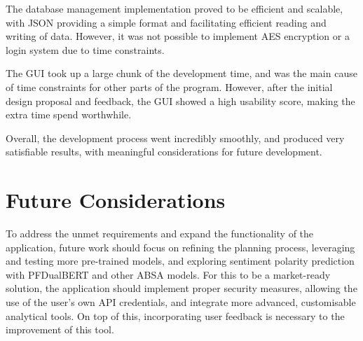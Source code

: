 The database management implementation proved to be efficient and scalable, with JSON providing a simple format and facilitating efficient reading and writing of data. However, it was not possible to implement AES encryption or a login system due to time constraints.

The GUI took up a large chunk of the development time, and was the main cause of time constraints for other parts of the program. However, after the initial design proposal and feedback, the GUI showed a high usability score, making the extra time spend worthwhile.

Overall, the development process went incredibly smoothly, and produced very satisfiable results, with meaningful considerations for future development.

\section{Future Considerations}
To address the unmet requirements and expand the functionality of the application, future work should focus on refining the planning process, leveraging and testing more pre-trained models, and exploring sentiment polarity prediction with PFDualBERT and other ABSA models. For this to be a market-ready solution, the application should implement proper security measures, allowing the use of the user's own API credentials, and integrate more advanced, customisable analytical tools. On top of this, incorporating user feedback is necessary to the improvement of this tool.
